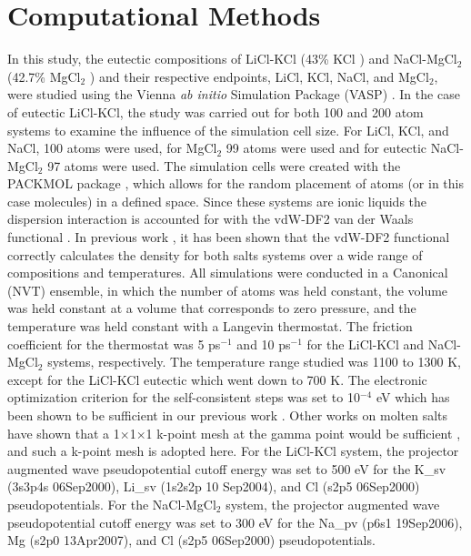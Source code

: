 \documentclass[review]{elsarticle}
\begin{document}
\section{Computational Methods}

In this study, the eutectic compositions of LiCl-KCl (43\% KCl \cite{Zhou2017}) and NaCl-MgCl$_2$ (42.7\% MgCl$_{2}$ \cite{FTsalt}) and their respective endpoints, LiCl, KCl, NaCl, and MgCl$_2$, were studied using the Vienna \textit{ab initio} Simulation Package (VASP) \cite{Kresse1993,Kresse1996,Kresse1996a}. In the case of eutectic LiCl-KCl, the study was carried out for both 100 and 200 atom systems to examine the influence of the simulation cell size. For LiCl, KCl, and NaCl, 100 atoms were used, for MgCl$_2$ 99 atoms were used and for eutectic NaCl-MgCl$_2$ 97 atoms were used. The simulation cells were created with the PACKMOL package \cite{martinez2009}, which allows for the random placement of atoms (or in this case molecules) in a defined space. Since these systems are ionic liquids the dispersion interaction is accounted for with the vdW-DF2 van der Waals functional \cite{Dion2004}. In previous work \cite{duemmler_liclkcl,duemmler_naclmgcl}, it has been shown that the vdW-DF2 functional correctly calculates the density for both salts systems over a wide range of compositions and temperatures. All simulations were conducted in a Canonical (NVT) ensemble, in which the number of atoms was held constant, the volume was held constant at a volume that corresponds to zero pressure, and the temperature was held constant with a Langevin thermostat. The friction coefficient for the thermostat was 5 ps$^{-1}$ and 10 ps$^{-1}$ for the LiCl-KCl and NaCl-MgCl$_2$ systems, respectively. The temperature range studied was 1100 to 1300 K, except for the LiCl-KCl eutectic which went down to 700 K. The electronic optimization criterion for the self-consistent steps was set to 10$^{-4}$ eV which has been shown to be sufficient in our previous work \cite{duemmler_naclmgcl}. Other works on molten salts have shown that a 1$\times$1$\times$1 k-point mesh at the gamma point would be sufficient \cite{Song2017, Bengston2014}, and such a k-point mesh is adopted here. For the LiCl-KCl system, the projector augmented wave pseudopotential cutoff energy was set to 500 eV for the K\_{sv} (3s3p4s 06Sep2000), Li\_{sv} (1s2s2p 10 Sep2004), and Cl (s2p5 06Sep2000) pseudopotentials. For the NaCl-MgCl$_2$ system, the projector augmented wave pseudopotential cutoff energy was set to 300 eV for the Na\_{pv} (p6s1 19Sep2006), Mg (s2p0 13Apr2007), and Cl (s2p5 06Sep2000) pseudopotentials.
\end{document}
